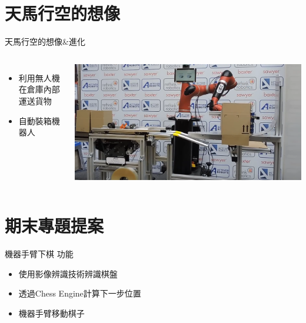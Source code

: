 \documentclass[10pt, aspectratio=169]{beamer}
\begin{document}




\section{天馬行空的想像}
\begin{frame}{天馬行空的想像\&進化}
  \begin{columns}
    \begin{itemize}
      \item 利用無人機在倉庫內部運送貨物
      \item 自動裝箱機器人
    \end{itemize}
    \centering
    \includegraphics[width=\textwidth]{images/box.png}
  \end{columns}
\end{frame}

\section{期末專題提案}
\begin{frame}{機器手臂下棋}
  \Large 功能
  \normalsize \begin{itemize}
    \item 使用影像辨識技術辨識棋盤
    \item 透過Chess Engine計算下一步位置
    \item 機器手臂移動棋子
  \end{itemize}
\end{frame}
\end{document}
